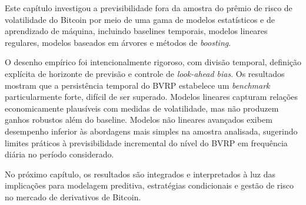 Este capítulo investigou a previsibilidade fora da amostra do prêmio de risco de
volatilidade do Bitcoin por meio de uma gama de modelos estatísticos e de
aprendizado de máquina, incluindo baselines temporais, modelos lineares
regulares, modelos baseados em árvores e métodos de \textit{boosting}.

O desenho empírico foi intencionalmente rigoroso, com divisão temporal, definição
explícita de horizonte de previsão e controle de \textit{look-ahead bias}. Os
resultados mostram que a persistência temporal do BVRP estabelece um
\textit{benchmark} particularmente forte, difícil de ser superado. Modelos lineares
capturam relações economicamente plausíveis com medidas de volatilidade, mas não
produzem ganhos robustos além do baseline. Modelos não lineares avançados exibem
desempenho inferior às abordagens mais simples na amostra analisada, sugerindo
limites práticos à previsibilidade incremental do nível do BVRP em frequência
diária no período considerado.

No próximo capítulo, os resultados são integrados e interpretados à luz das
implicações para modelagem preditiva, estratégias condicionais e gestão de risco
no mercado de derivativos de Bitcoin.
